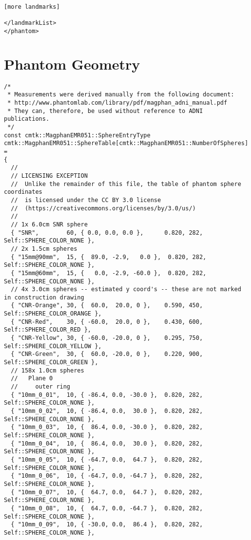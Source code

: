 \documentclass{InsightArticle}
\begin{document}
\begin{verbatim}
[more landmarks]

</landmarkList>
</phantom>
\end{verbatim}

\section{Phantom Geometry}
\label{sec:PhantomGeometry}

{\small
\begin{verbatim}
/*
 * Measurements were derived manually from the following document: 
 * http://www.phantomlab.com/library/pdf/magphan_adni_manual.pdf
 * They can, therefore, be used without reference to ADNI publications.
 */
const cmtk::MagphanEMR051::SphereEntryType 
cmtk::MagphanEMR051::SphereTable[cmtk::MagphanEMR051::NumberOfSpheres] =
{
  // 
  // LICENSING EXCEPTION
  //  Unlike the remainder of this file, the table of phantom sphere coordinates
  //  is licensed under the CC BY 3.0 license
  //  (https://creativecommons.org/licenses/by/3.0/us/)
  //
  // 1x 6.0cm SNR sphere
  { "SNR",        60, { 0.0, 0.0, 0.0 },      0.820, 282, Self::SPHERE_COLOR_NONE }, 
  // 2x 1.5cm spheres
  { "15mm@90mm",  15, {  89.0, -2.9,   0.0 },  0.820, 282, Self::SPHERE_COLOR_NONE },
  { "15mm@60mm",  15, {   0.0, -2.9, -60.0 },  0.820, 282, Self::SPHERE_COLOR_NONE },
  // 4x 3.0cm spheres -- estimated y coord's -- these are not marked in construction drawing
  { "CNR-Orange", 30, {  60.0,  20.0, 0 },    0.590, 450, Self::SPHERE_COLOR_ORANGE },
  { "CNR-Red",    30, { -60.0,  20.0, 0 },    0.430, 600, Self::SPHERE_COLOR_RED },   
  { "CNR-Yellow", 30, { -60.0, -20.0, 0 },    0.295, 750, Self::SPHERE_COLOR_YELLOW },
  { "CNR-Green",  30, {  60.0, -20.0, 0 },    0.220, 900, Self::SPHERE_COLOR_GREEN }, 
  // 158x 1.0cm spheres
  //   Plane 0
  //     outer ring
  { "10mm_0_01",  10, { -86.4, 0.0, -30.0 },  0.820, 282, Self::SPHERE_COLOR_NONE },
  { "10mm_0_02",  10, { -86.4, 0.0,  30.0 },  0.820, 282, Self::SPHERE_COLOR_NONE },
  { "10mm_0_03",  10, {  86.4, 0.0, -30.0 },  0.820, 282, Self::SPHERE_COLOR_NONE },
  { "10mm_0_04",  10, {  86.4, 0.0,  30.0 },  0.820, 282, Self::SPHERE_COLOR_NONE }, 
  { "10mm_0_05",  10, { -64.7, 0.0,  64.7 },  0.820, 282, Self::SPHERE_COLOR_NONE },
  { "10mm_0_06",  10, { -64.7, 0.0, -64.7 },  0.820, 282, Self::SPHERE_COLOR_NONE },
  { "10mm_0_07",  10, {  64.7, 0.0,  64.7 },  0.820, 282, Self::SPHERE_COLOR_NONE },
  { "10mm_0_08",  10, {  64.7, 0.0, -64.7 },  0.820, 282, Self::SPHERE_COLOR_NONE },
  { "10mm_0_09",  10, { -30.0, 0.0,  86.4 },  0.820, 282, Self::SPHERE_COLOR_NONE },

\end{verbatim}}
\end{document}
